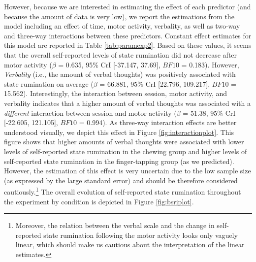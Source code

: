 \documentclass[a4paper,12pt,twoside,onecolumn,openright,final,oldfontcommands]{memoir}
\let\rmarkdownfootnote\footnote%
\def\footnote{\protect\rmarkdownfootnote}
\begin{document}
However, because we are interested in estimating the effect of each predictor (and because the amount of data is very low), we report the estimations from the model including an effect of time, motor activity, verbality, as well as two-way and three-way interactions between these predictors. Constant effect estimates for this model are reported in Table \ref{tab:paramexp2}. Based on these values, it seems that the overall self-reported levels of state rumination did not decrease after motor activity (\(\beta\) = 0.635, 95\% CrI {[}-37.147, 37.69{]}, \(BF10\) = 0.183). However, \emph{Verbality} (i.e., the amount of verbal thoughts) was positively associated with state rumination on average (\(\beta\) = 66.881, 95\% CrI {[}22.796, 109.217{]}, \(BF10\) = 15.562). Interestingly, the interaction between session, motor activity, and verbality indicates that a higher amount of verbal thoughts was associated with a \emph{different} interaction between session and motor activity (\(\beta\) = 51.38, 95\% CrI {[}-22.605, 121.105{]}, \(BF10\) = 0.994). As three-way interaction effects are better understood visually, we depict this effect in Figure \ref{fig:interactionplot}. This figure shows that higher amounts of verbal thoughts were associated with lower levels of self-reported state rumination in the chewing group and higher levels of self-reported state rumination in the finger-tapping group (as we predicted). However, the estimation of this effect is very uncertain due to the low sample size (as expressed by the large standard error) and should be therefore considered cautiously.\footnote{Moreover, the relation between the verbal scale and the change in self-reported state rumination following the motor activity looks only vaguely linear, which should make us cautious about the interpretation of the linear estimates.} The overall evolution of self-reported state rumination throughout the experiment by condition is depicted in Figure \ref{fig:bsriplot}.
\end{document}
